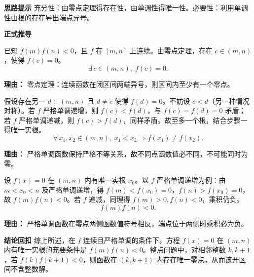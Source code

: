 \begin{proofbox}
	\textbf{\textcolor{CProof}{思路提示}}
	充分性：由零点定理得存在性，由单调性得唯一性。必要性：利用单调性由根的存在导出端点异号。

	\medskip
	\textbf{\textcolor{CProof}{正式推导}}
	\begin{description}[style=nextline, leftmargin=2.8em, labelsep=0.5em, itemsep=0.55em]
		\item[\textbf{步骤一（充分性存在性）：}]
			已知 $f(m)f(n)<0$，且 $f$ 在 $[m,n]$ 上连续。由零点定理，存在 $c\in(m,n)$，使得 $f(c)=0$。
			\[
				\exists\, c\in(m,n),\; f(c)=0.
			\]
			\par\textbf{理由：} 零点定理：连续函数在闭区间两端异号，则区间内至少有一个零点。
		\item[\textbf{步骤二（充分性唯一性）：}]
			假设存在另一 $d\in(m,n)$ 且 $d\neq c$ 使得 $f(d)=0$。不妨设 $c<d$（另一种情况对称）。若 $f$ 严格单调递增，则 $f(c)<f(d)$，与 $f(c)=f(d)=0$ 矛盾；若 $f$ 严格单调递减，则 $f(c)>f(d)$，同样矛盾。故至多一个根，结合步骤一得唯一实根。
			\[
				\forall\, x_1,x_2\in(m,n),\; x_1<x_2 \Rightarrow f(x_1)\neq f(x_2).
			\]
			\par\textbf{理由：} 严格单调函数保持严格不等关系，故不同点函数值必不同，不可能同时为零。
		\item[\textbf{步骤三（必要性端点异号）：}]
			设 $f(x)=0$ 在 $(m,n)$ 内有唯一实根 $x_0$。以 $f$ 严格单调递增为例：由 $m<x_0<n$ 及严格单调递增，得 $f(m)<f(x_0)=0$，$f(n)>f(x_0)=0$，故 $f(m)f(n)<0$。若 $f$ 递减，同理得 $f(m)>0, f(n)<0$，乘积仍负。
			\[
				f(m)f(n)<0.
			\]
			\par\textbf{理由：} 严格单调函数在零点两侧函数值符号相反，端点位于两侧时乘积必为负。
	\end{description}

	\medskip
	\textbf{\textcolor{CProof}{结论回扣}}
	综上所述，在 $f$ 连续且严格单调的条件下，方程 $f(x)=0$ 在 $(m,n)$ 内有唯一实根的充要条件是 $f(m)f(n)<0$。整点问题中，对相邻整数 $k,k+1$，若 $f(k)f(k+1)<0$，则函数在 $(k,k+1)$ 内存在唯一零点，从而该开区间不含整数解。
\end{proofbox}
